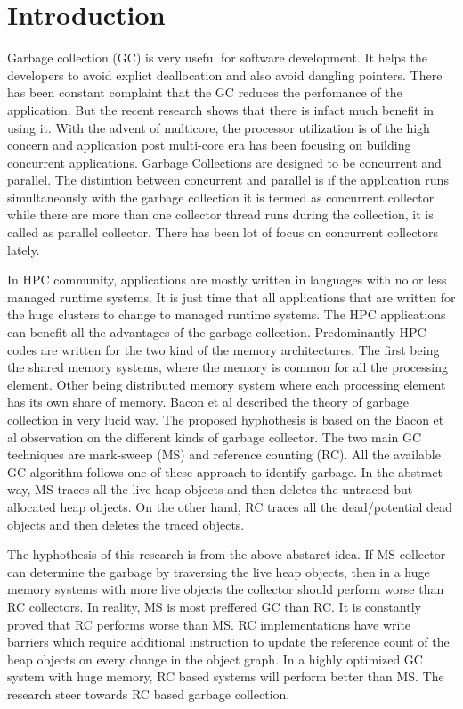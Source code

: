\section{Introduction}
Garbage collection (GC) is very useful for software development. It helps the developers to avoid explict deallocation and also avoid dangling pointers. There has been constant complaint that the GC reduces the perfomance of the application. But the recent research shows that there is infact much benefit in using it. With the advent of multicore, the processor utilization is of the high concern and application post multi-core era has been focusing on building concurrent applications. Garbage Collections are designed to be concurrent and parallel. The distintion between concurrent and parallel is if the application runs simultaneously with the garbage collection it is termed as concurrent collector while there are more than one collector thread runs during the collection, it is called as parallel collector. There has been lot of focus on concurrent collectors lately. 

In HPC community, applications are mostly written in languages with no or less managed runtime systems. It is just time that all applications that are written for the huge clusters to change to managed runtime systems. The HPC applications can benefit all the advantages of the garbage collection. Predominantly HPC codes are written for the two kind of the memory architectures. The first being the shared memory systems, where the memory is common for all the processing element. Other being distributed memory system where each processing element has its own share of memory. Bacon et al described the theory of garbage collection in very lucid way. The proposed hyphothesis is based on the Bacon et al observation on the different kinds of garbage collector. The two main GC techniques are mark-sweep (MS) and reference counting (RC). All the available GC algorithm follows one of these approach to identify garbage. In the abstract way, MS traces all the live heap objects and then deletes the untraced but allocated heap objects. On the other hand, RC traces all the dead/potential dead objects and then deletes the traced objects. 

The hyphothesis of this research is from the above abstarct idea. If MS collector can determine the garbage by traversing the live heap objects, then in a huge memory systems with more live objects the collector should perform worse than RC collectors. In reality, MS is most preffered GC than RC. It is constantly proved that RC performs worse than MS. RC implementations have write barriers which require additional instruction to update the reference count of the heap objects on every change in the object graph.
In a highly optimized GC system with huge memory, RC based systems will perform better than MS. The research steer towards RC based garbage collection.
